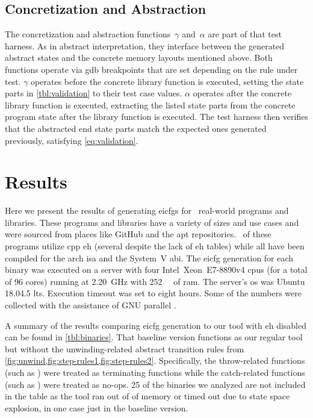 \subsection{Concretization and Abstraction}
The concretization and abstraction functions~$\gamma$ and~$\alpha$ are part of that test harness.
As in abstract interpretation, they interface between the generated abstract states and the concrete memory layouts mentioned above.
Both functions operate via \ac{gdb} breakpoints that are set depending on the rule under test.
$\gamma$ operates before the concrete library function is executed, setting the state parts in \cref{tbl:validation} to their test case values.
$\alpha$ operates after the concrete library function is executed, extracting the listed state parts from the concrete program state after the library function is executed.
The test harness then verifies that the abstracted end state parts match the expected ones generated previously, satisfying \cref{eq:validation}.

\section{Results}\label{eicfg-results}
Here we present the results of generating \acp{eicfg} for \totalbins\ real-world programs and libraries.
These programs and libraries have a variety of sizes and use cases and were sourced from places like GitHub and the \ac{apt} repositories.
\exceptbins\ of these programs utilize \gls{cpp} \ac{eh} (several despite the lack of \ac{eh} tables) while all have been compiled for the \gls{arch} \ac{isa} and the System~V \ac{abi}.
The \ac{eicfg} generation for each binary was executed on a server with four Intel\textregistered\ Xeon\textregistered\ E7-8890v4 \acp{cpu} (for a total of 96 cores) running at \SI{2.20}{\giga\hertz} with \SI{252}{\gibi\byte} of \ac{ram}.
The server's \ac{os} was Ubuntu 18.04.5 \ac{lts}.
Execution timeout was set to eight hours. %
Some of the numbers were collected with the assistance of GNU parallel \autocite{Tange2011a}.

A summary of the results comparing \ac{eicfg} generation to our tool with \ac{eh} disabled can be found in \cref{tbl:binaries}.
That baseline version functions as our regular tool but without the unwinding-related abstract transition rules from \cref{fig:unwind,fig:step-rules1,fig:step-rules2}. Specifically, the throw-related functions (such as ) were treated as terminating functions while the catch-related functions (such as ) were treated as no-ops.
25 of the binaries we analyzed are not included in the table as the tool ran out of of memory or timed out due to state space explosion, in one case just in the baseline version.

